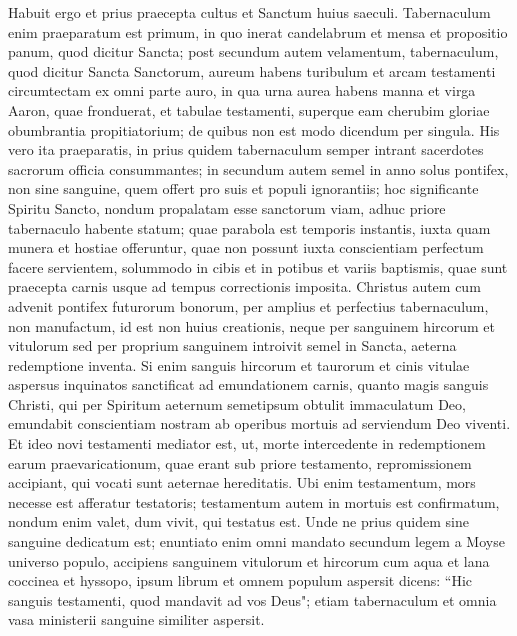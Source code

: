 \begin{biblechapter} 
\verse Habuit ergo et prius praecepta cultus et Sanctum huius saeculi. 
\verse Tabernaculum enim praeparatum est primum, in quo inerat candelabrum et mensa et propositio panum, quod dicitur Sancta; 
\verse post secundum autem velamentum, tabernaculum, quod dicitur Sancta Sanctorum, 
\verse aureum habens turibulum et arcam testamenti circumtectam ex omni parte auro, in qua urna aurea habens manna et virga Aaron, quae fronduerat, et tabulae testamenti, 
\verse superque eam cherubim gloriae obumbrantia propitiatorium; de quibus non est modo dicendum per singula. 
\verse His vero ita praeparatis, in prius quidem tabernaculum semper intrant sacerdotes sacrorum officia consummantes; 
\verse in secundum autem semel in anno solus pontifex, non sine sanguine, quem offert pro suis et populi ignorantiis; 
\verse hoc significante Spiritu Sancto, nondum propalatam esse sanctorum viam, adhuc priore tabernaculo habente statum; 
\verse quae parabola est temporis instantis, iuxta quam munera et hostiae offeruntur, quae non possunt iuxta conscientiam perfectum facere servientem, 
\verse solummodo in cibis et in potibus et variis baptismis, quae sunt praecepta carnis usque ad tempus correctionis imposita. 
\verse Christus autem cum advenit pontifex futurorum bonorum, per amplius et perfectius tabernaculum, non manufactum, id est non huius creationis, 
\verse neque per sanguinem hircorum et vitulorum sed per proprium sanguinem introivit semel in Sancta, aeterna redemptione inventa. 
\verse Si enim sanguis hircorum et taurorum et cinis vitulae aspersus inquinatos sanctificat ad emundationem carnis, 
\verse quanto magis sanguis Christi, qui per Spiritum aeternum semetipsum obtulit immaculatum Deo, emundabit conscientiam nostram ab operibus mortuis ad serviendum Deo viventi. 
\verse Et ideo novi testamenti mediator est, ut, morte intercedente in redemptionem earum praevaricationum, quae erant sub priore testamento, repromissionem accipiant, qui vocati sunt aeternae hereditatis. 
\verse Ubi enim testamentum, mors necesse est afferatur testatoris; 
\verse testamentum autem in mortuis est confirmatum, nondum enim valet, dum vivit, qui testatus est. 
\verse Unde ne prius quidem sine sanguine dedicatum est; 
\verse enuntiato enim omni mandato secundum legem a Moyse universo populo, accipiens sanguinem vitulorum et hircorum cum aqua et lana coccinea et hyssopo, ipsum librum et omnem populum aspersit 
\verse dicens: “Hic sanguis testamenti, quod mandavit ad vos Deus"; 
\verse etiam tabernaculum et omnia vasa ministerii sanguine similiter aspersit. 

\end{biblechapter}

